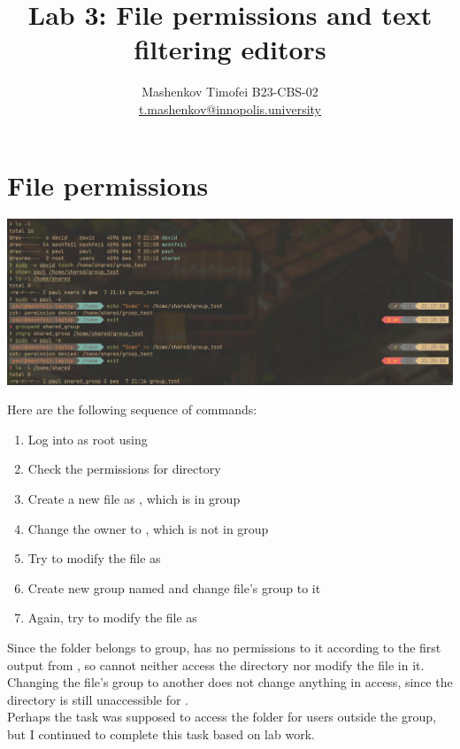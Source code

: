 \documentclass{article}
\title{Lab 3: File permissions and text filtering editors}
\author{Mashenkov Timofei B23-CBS-02 \\ \href{mailto:t.mashenkov@innopolis.university}{t.mashenkov@innopolis.university}}
\begin{document}
\maketitle{}

\section{File permissions}
\noindent

\includegraphics[width=460pt]{03_01.jpg}
\newline

Here are the following sequence of commands:

\begin{enumerate}
	\item Log into as root using 
	\item Check the permissions for  directory
	\item Create a new file as , which is in  group
	\item Change the owner to , which is not in  group
	\item Try to modify the file as 
	\item Create new group named  and change  file's group to it
	\item Again, try to modify the file as 
\end{enumerate}

Since the folder  belongs to  group,  has no permissions to it according to the first output from , so  cannot neither access the directory nor modify the file in it.
Changing the file's group to another does not change anything in access, since the directory is still unaccessible for
. \\ 

Perhaps the task was supposed to access the folder for users outside the  group, but I continued to complete this task based on lab work.
\end{document}
